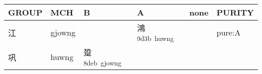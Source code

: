 \documentclass[14pt,a4paper]{scrartcl}
\begin{document}
\begin{longtable}[c]{@{}llllll@{}}
\toprule
\begin{minipage}[b]{0.14\columnwidth}\raggedright\strut
GROUP
\strut\end{minipage} &
\begin{minipage}[b]{0.14\columnwidth}\raggedright\strut
MCH
\strut\end{minipage} &
\begin{minipage}[b]{0.14\columnwidth}\raggedright\strut
B
\strut\end{minipage} &
\begin{minipage}[b]{0.14\columnwidth}\raggedright\strut
A
\strut\end{minipage} &
\begin{minipage}[b]{0.14\columnwidth}\raggedright\strut
none
\strut\end{minipage} &
\begin{minipage}[b]{0.14\columnwidth}\raggedright\strut
PURITY
\strut\end{minipage}\tabularnewline
\midrule
\endhead
\begin{minipage}[t]{0.14\columnwidth}\raggedright\strut
江
\strut\end{minipage} &
\begin{minipage}[t]{0.14\columnwidth}\raggedright\strut
gjowng
\strut\end{minipage} &
\begin{minipage}[t]{0.14\columnwidth}\raggedright\strut
\strut\end{minipage} &
\begin{minipage}[t]{0.14\columnwidth}\raggedright\strut
鴻\textsuperscript{9d3b~huwng}
\strut\end{minipage} &
\begin{minipage}[t]{0.14\columnwidth}\raggedright\strut
\strut\end{minipage} &
\begin{minipage}[t]{0.14\columnwidth}\raggedright\strut
pure:A
\strut\end{minipage}\tabularnewline
\begin{minipage}[t]{0.14\columnwidth}\raggedright\strut
巩
\strut\end{minipage} &
\begin{minipage}[t]{0.14\columnwidth}\raggedright\strut
huwng
\strut\end{minipage} &
\begin{minipage}[t]{0.14\columnwidth}\raggedright\strut
跫\textsuperscript{8deb~gjowng}
\strut\end{minipage} &

\end{longtable}
\end{document}
